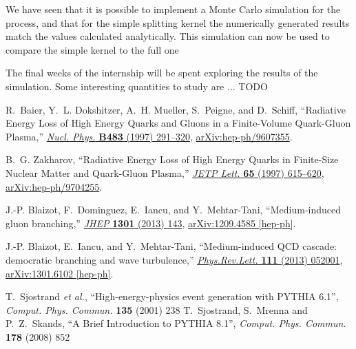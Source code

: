 \documentclass[a4paper,12pt]{article}
\numberwithin{equation}{section}
\begin{document}
We have seen that it is possible to implement a Monte Carlo simulation for the process, and that for the simple splitting kernel the numerically generated results match the values calculated analytically. This simulation can now be used to compare the simple kernel to the full one

The final weeks of the internship will be spent exploring the results of the simulation. Some interesting quantities to study are ... TODO

 \begin{thebibliography}{10}
 
R.~Baier, Y.~L. Dokshitzer, A.~H. Mueller, S.~Peigne, and D.~Schiff,
  ``{Radiative Energy Loss of High Energy Quarks and Gluons in a Finite-Volume
  Quark-Gluon Plasma},''
  \href{http://dx.doi.org/10.1016/S0550-3213(96)00553-6}{{\em Nucl. Phys.}
  {\bfseries B483} (1997) 291--320},
\href{http://arxiv.org/abs/hep-ph/9607355}{{\ttfamily arXiv:hep-ph/9607355}}.

B.~G. Zakharov, ``{Radiative Energy Loss of High Energy Quarks in Finite-Size
  Nuclear Matter and Quark-Gluon Plasma},''
  \href{http://dx.doi.org/10.1134/1.567389}{{\em JETP Lett.} {\bfseries 65}
  (1997) 615--620},
\href{http://arxiv.org/abs/hep-ph/9704255}{{\ttfamily arXiv:hep-ph/9704255}}.

J.-P. Blaizot, F.~Dominguez, E.~Iancu, and Y.~Mehtar-Tani, ``{Medium-induced
  gluon branching},'' \href{http://dx.doi.org/10.1007/JHEP01(2013)143}{{\em
  JHEP} {\bfseries 1301} (2013) 143},
\href{http://arxiv.org/abs/1209.4585}{{\ttfamily arXiv:1209.4585 [hep-ph]}}.


J.-P. Blaizot, E.~Iancu, and Y.~Mehtar-Tani, ``{Medium-induced QCD cascade:
  democratic branching and wave turbulence},''
  \href{http://dx.doi.org/10.1103/PhysRevLett.111.052001}{{\em Phys.Rev.Lett.}
  {\bfseries 111} (2013) 052001},
\href{http://arxiv.org/abs/1301.6102}{{\ttfamily arXiv:1301.6102 [hep-ph]}}.





  T.~Sjostrand {\it et al.},
  ``{High-energy-physics event generation with PYTHIA 6.1}'',
  {\it Comput. Phys. Commun.}  {\bf 135} (2001) 238 
  T.~Sjostrand, S.~Mrenna and P.~Z.~Skands,
  ``{A Brief Introduction to PYTHIA 8.1}'',
  {\it Comput. Phys. Commun.}  {\bf 178} (2008) 852


\end{thebibliography}
\end{document}
